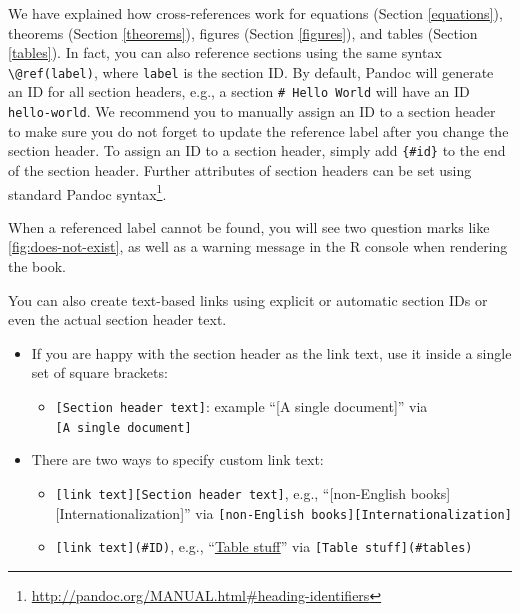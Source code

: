 \documentclass[
  12pt,
]{krantz}
\providecommand{\tightlist}{%
  \setlength{\itemsep}{0pt}\setlength{\parskip}{0pt}}
\renewcommand{\href}[2]{#2\footnote{\url{#1}}}
\theoremstyle{definition}
\theoremstyle{definition}
\theoremstyle{definition}
\theoremstyle{definition}
\theoremstyle{remark}
\begin{document}
We have explained how cross-references work for equations (Section \ref{equations}), theorems (Section \ref{theorems}), figures (Section \ref{figures}), and tables (Section \ref{tables}). In fact, you can also reference sections using the same syntax \texttt{\textbackslash{}@ref(label)}, where \texttt{label} is the section ID. By default, Pandoc will generate an ID for all section headers, e.g., a section \texttt{\#\ Hello\ World} will have an ID \texttt{hello-world}. We recommend you to manually assign an ID to a section header to make sure you do not forget to update the reference label after you change the section header. To assign an ID to a section header, simply add \texttt{\{\#id\}} to the end of the section header. Further attributes of section headers can be set using standard \href{http://pandoc.org/MANUAL.html\#heading-identifiers}{Pandoc syntax}.

When a referenced label cannot be found, you will see two question marks like \ref{fig:does-not-exist}, as well as a warning message in the R console when rendering the book.

You can also create text-based links using explicit or automatic section IDs or even the actual section header text.

\begin{itemize}
\tightlist
\item
  If you are happy with the section header as the link text, use it inside a single set of square brackets:

  \begin{itemize}
  \tightlist
  \item
    \texttt{{[}Section\ header\ text{]}}: example ``{[}A single document{]}'' via \texttt{{[}A\ single\ document{]}}
  \end{itemize}
\item
  There are two ways to specify custom link text:

  \begin{itemize}
  \tightlist
  \item
    \texttt{{[}link\ text{]}{[}Section\ header\ text{]}}, e.g., ``{[}non-English books{]}{[}Internationalization{]}'' via \texttt{{[}non-English\ books{]}{[}Internationalization{]}}
  \item
    \texttt{{[}link\ text{]}(\#ID)}, e.g., ``\protect\hyperlink{tables}{Table stuff}'' via \texttt{{[}Table\ stuff{]}(\#tables)}
  \end{itemize}
\end{itemize}
\end{document}
